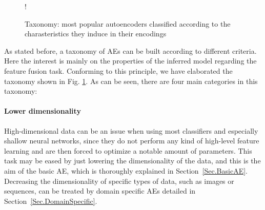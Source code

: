 \begin{figure}[htp!]
	\centering
	\resizebox {1.2\figwidth} {!} {
		
	}
	\caption{Taxonomy: most popular autoencoders classified according to the charasteristics they induce in their encodings}
	\label{fig:autoencoder-taxonomy}
\end{figure}

As stated before, a taxonomy of AEs can be built according to different criteria. Here the interest is mainly on the properties of the inferred model regarding the feature fusion task. Conforming to this principle, we have elaborated the taxonomy shown in Fig. \ref{fig:autoencoder-taxonomy}. As can be seen, there are four main categories in this taxonomy:

\paragraph{Lower dimensionality}
High-dimensional data can be an issue when using most classifiers and especially shallow neural networks, since they do not perform any kind of high-level feature learning and are then forced to optimize a notable amount of parameters. This task may be eased by just lowering the dimensionality of the data, and this is the aim of the basic AE, which is thoroughly explained in Section~\ref{Sec.BasicAE}. Decreasing the dimensionality of specific types of data, such as images or sequences, can be treated by domain specific AEs detailed in Section~\ref{Sec.DomainSpecific}.

